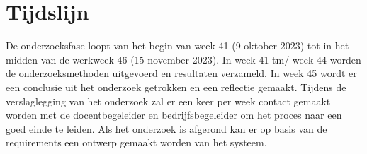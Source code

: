 \section{Tijdslijn}
De onderzoeksfase loopt van het begin van week 41 (9 oktober 2023) tot in het midden van de werkweek 46 (15 november 2023).
In week 41 tm/ week 44 worden de onderzoeksmethoden uitgevoerd en resultaten verzameld.
In week 45 wordt er een conclusie uit het onderzoek getrokken en een reflectie gemaakt.
Tijdens de verslaglegging van het onderzoek zal er een keer per week contact gemaakt worden met de docentbegeleider en bedrijfsbegeleider om het proces naar een goed einde te leiden.
Als het onderzoek is afgerond kan er op basis van de requirements een ontwerp gemaakt worden van het systeem.
